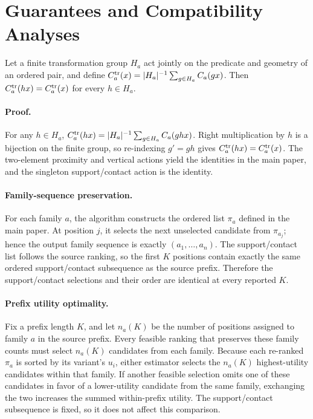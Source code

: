 \section{Guarantees and Compatibility Analyses}

\begin{proposition}
Let a finite transformation group $H_a$ act jointly on the predicate and
geometry of an ordered pair, and define
$C_a^{\rm tr}(x)=|H_a|^{-1}\sum_{g\in H_a}C_a(gx)$. Then
$C_a^{\rm tr}(hx)=C_a^{\rm tr}(x)$ for every $h\in H_a$.
\end{proposition}

\paragraph{Proof.}
For any $h\in H_a$,
\(
C_a^{\rm tr}(hx)=|H_a|^{-1}\sum_{g\in H_a}C_a(ghx)
\).
Right multiplication by $h$ is a bijection on the finite group, so re-indexing
$g'=gh$ gives $C_a^{\rm tr}(hx)=C_a^{\rm tr}(x)$. The two-element proximity
and vertical actions yield the identities in the main paper, and the singleton
support/contact action is the identity.

\paragraph{Family-sequence preservation.}
For each family $a$, the algorithm constructs the ordered list $\pi_a$ defined
in the main paper. At position $j$, it selects the next unselected candidate
from $\pi_{a_j}$; hence the output family sequence is exactly
$(a_1,\ldots,a_n)$. The support/contact list follows the source ranking, so the
first $K$ positions contain exactly the same ordered support/contact subsequence
as the source prefix. Therefore the support/contact selections and their order
are identical at every reported $K$.

\paragraph{Prefix utility optimality.}
Fix a prefix length $K$, and let $n_a(K)$ be the number of positions assigned
to family $a$ in the source prefix. Every feasible ranking that preserves these
family counts must select $n_a(K)$ candidates from each family. Because each
re-ranked $\pi_a$ is sorted by its variant's $u_i$, either \method{} estimator selects the $n_a(K)$
highest-utility candidates within that family. If another feasible selection
omits one of these candidates in favor of a lower-utility candidate from the
same family, exchanging the two increases the summed within-prefix utility.
The support/contact subsequence is fixed, so it does not affect this comparison.

